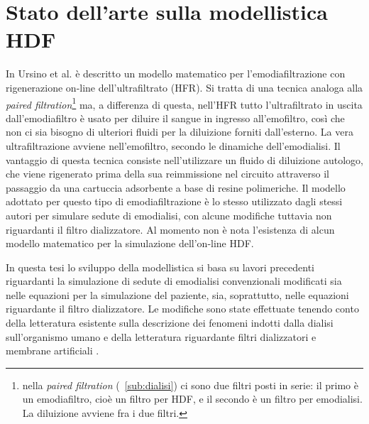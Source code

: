 \section{Stato dell'arte sulla modellistica HDF}\label{sec:stato}
In Ursino et al. \cite{ursino3} è descritto un modello matematico per l'emodiafiltrazione con rigenerazione on-line dell'ultrafiltrato (HFR). Si tratta di una tecnica analoga alla \textit{paired filtration}\footnote{nella \textit{paired filtration} (\textsection~\ref{sub:dialisi}) ci sono due filtri posti in serie: il primo è un emodiafiltro, cioè un filtro per HDF, e il secondo è un filtro per emodialisi. La diluizione avviene fra i due filtri.} ma, a differenza di questa, nell'HFR tutto l'ultrafiltrato in uscita dall'emodiafiltro è usato per diluire il sangue in ingresso all'emofiltro, così che non ci sia bisogno di ulteriori fluidi per la diluizione forniti dall'esterno. La vera ultrafiltrazione avviene nell'emofiltro, secondo le dinamiche dell'emodialisi. Il vantaggio di questa tecnica consiste nell'utilizzare un fluido di diluizione autologo, che viene rigenerato prima della sua reimmissione nel circuito attraverso il passaggio da una cartuccia adsorbente a base di resine polimeriche. Il modello adottato per questo tipo di emodiafiltrazione è lo stesso utilizzato dagli stessi autori per simulare sedute di emodialisi, con alcune modifiche tuttavia non riguardanti il filtro dializzatore.
Al momento non è nota l'esistenza di alcun modello matematico per la simulazione dell'on-line HDF.

In questa tesi lo sviluppo della modellistica si basa su lavori precedenti riguardanti la simulazione di sedute di emodialisi convenzionali \cite{casagrande, gatti, SilvTer, merulla, ursino} modificati sia nelle equazioni per la simulazione del paziente, sia, soprattutto, nelle equazioni riguardante il filtro dializzatore. Le modifiche sono state effettuate tenendo conto della letteratura esistente sulla descrizione dei fenomeni indotti dalla dialisi sull'organismo umano \cite{ursino2, gyenge, gyenge2} e della letteratura riguardante filtri dializzatori e membrane artificiali \cite{colton, Liao, samtleben, gmerek, ficheux}.